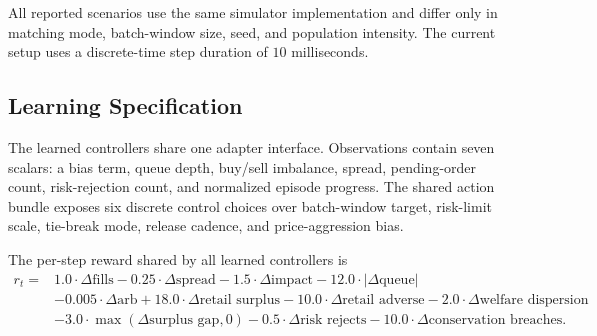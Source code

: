 \documentclass[11pt]{article}
\begin{document}
\begin{table}[t]
\centering
\footnotesize
{}
\caption{Protocol summary. The key separation is between exploratory learning-dynamics artifacts and the matched calibrated comparison used for paper-facing method claims.}
\label{tab:protocolsummary}
\end{table}

All reported scenarios use the same simulator implementation and differ only in matching mode, batch-window size, seed, and population intensity. The current setup uses a discrete-time step duration of $10$ milliseconds.

\subsection{Learning Specification}
The learned controllers share one adapter interface. Observations contain seven scalars: a bias term, queue depth, buy/sell imbalance, spread, pending-order count, risk-rejection count, and normalized episode progress. The shared action bundle exposes six discrete control choices over batch-window target, risk-limit scale, tie-break mode, release cadence, and price-aggression bias.

The per-step reward shared by all learned controllers is
\begin{align*}
r_t ={}& 1.0 \cdot \Delta \text{fills}
- 0.25 \cdot \Delta \text{spread}
- 1.5 \cdot \Delta \text{impact}
- 12.0 \cdot |\Delta \text{queue}| \\
&- 0.005 \cdot \Delta \text{arb}
+ 18.0 \cdot \Delta \text{retail surplus}
- 10.0 \cdot \Delta \text{retail adverse}
- 2.0 \cdot \Delta \text{welfare dispersion} \\
&- 3.0 \cdot \max(\Delta \text{surplus gap}, 0)
- 0.5 \cdot \Delta \text{risk rejects}
- 10.0 \cdot \Delta \text{conservation breaches}.
\end{align*}
\end{document}
